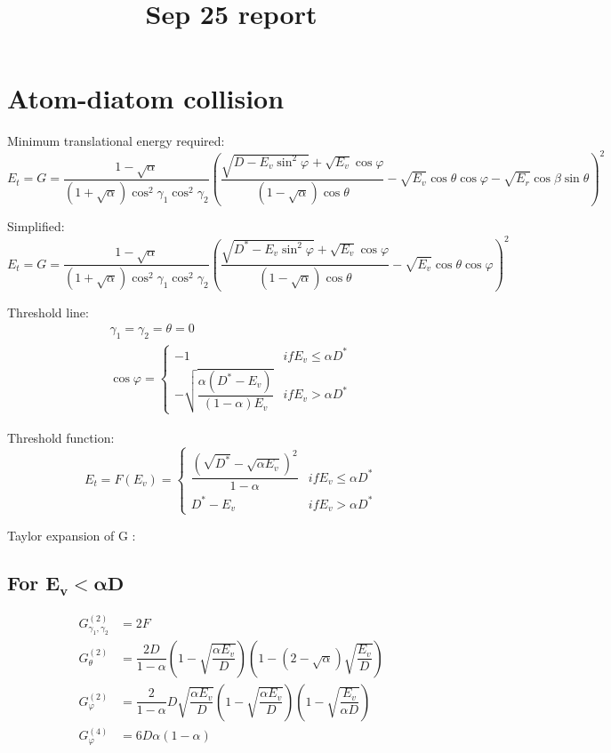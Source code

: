 \documentclass[11pt,letterpaper]{article}
\title{Sep 25 report}
\makeatletter
\renewcommand{\maketitle}{
	\begin{center}
		{\large \textbf {\@title}}
	\end{center}
}
\renewcommand{\phi}{\varphi}
\makeatother
\begin{document}
\maketitle
\section{Atom-diatom collision}
Minimum translational energy required:
\begin{equation}
E_t= G= \frac{1-\sqrt{\alpha} }{\left(1+\sqrt{\alpha }\right) \cos^2\gamma_1 \cos^2\gamma_2}\left(\frac{\sqrt{D-E_v \sin ^2\varphi }+\sqrt{E_v} \cos \phi }{\left(1-\sqrt{\alpha
	}\right) \cos \theta }-\sqrt{E_v} \cos \theta  \cos \phi - \sqrt{E_{r}} \cos \beta \sin \theta\right)^2
\end{equation}

Simplified:
\begin{equation}
E_t= G= \frac{1-\sqrt{\alpha} }{\left(1+\sqrt{\alpha }\right) \cos^2\gamma_1 \cos^2\gamma_2}\left(\frac{\sqrt{D^*-E_v \sin ^2\varphi }+\sqrt{E_v} \cos \phi }{\left(1-\sqrt{\alpha
	}\right) \cos \theta }-\sqrt{E_v} \cos \theta  \cos \phi \right)^2
\end{equation}

Threshold line:
\begin{gather}
\gamma_1=\gamma_2=\theta=0 \\
\cos \phi = \begin{cases}
-1   & if E_v\le \alpha D^*\\ 
-\sqrt{\dfrac{\alpha  (D^*-E_v)}{(1-\alpha ) E_v}} & if E_v> \alpha D^*
\end{cases}
\end{gather}

Threshold function:
\begin{equation}
E_t=F(E_v) = \begin{cases}
\dfrac{(\sqrt{D^*} - \sqrt{\alpha E_v})^2}{1-\alpha}   & if E_v\le \alpha D^*\\ 
D^*-E_v & if E_v> \alpha D^*
\end{cases}
\end{equation}

Taylor expansion of G :

\subsection{For $\pmb{ E_v < \alpha D }$ }

\begin{equation}
\begin{aligned}
G_{\gamma_1,\gamma_2}^{(2)} & = 2F\\
G_{\theta}^{(2)} &= \dfrac{2D}{1-\alpha} \left(1 - \sqrt{\dfrac{\alpha E_v}{D}}\right) \left(1- (2-\sqrt{\alpha} ) \sqrt{\dfrac{E_v}{D}}\right) \\
G_{\phi}^{(2)} &= \dfrac{2}{1-\alpha} D \sqrt{\dfrac{\alpha E_v}{D}} \left(1- \sqrt{\dfrac{\alpha E_v}{D}}\right) \left(1 - \sqrt{ \dfrac{E_v}{\alpha D}}\right)\\
G_{\phi}^{(4)} &= 6D \alpha (1-\alpha)
\end{aligned}
\end{equation}
\end{document}
